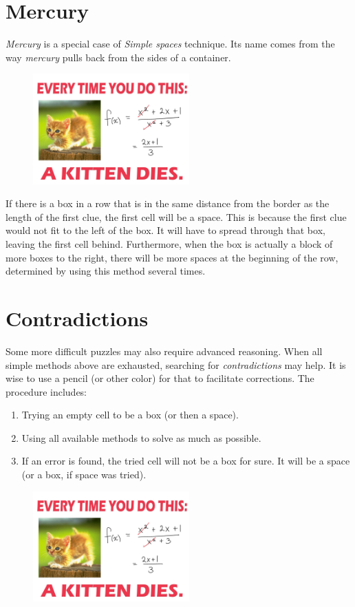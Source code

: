 \section{Mercury}
\textit{Mercury} is a special case of \textit{Simple spaces} technique. Its name comes from the way \textit{mercury} pulls back from the sides of a container.
\begin{figure}
\centering
\includegraphics[width=6cm]{picture/obr.jpg}
\end{figure}
If there is a box in a row that is in the same distance from the border as the length of the first clue, the first cell will be a space. This is because the first clue would not fit to the left of the box. It will have to spread through that box, leaving the first cell behind. Furthermore, when the box is actually a block of more boxes to the right, there will be more spaces at the beginning of the row, determined by using this method several times.


\section{Contradictions}
Some more difficult puzzles may also require advanced reasoning. When all simple methods above are exhausted, searching for \textit{contradictions} may help. It is wise to use a pencil (or other color) for that to facilitate corrections. The procedure includes:

\begin{enumerate} 
 \item {Trying an empty cell to be a box (or then a space).}

\item {Using all available methods to solve as much as possible.}

\item {If an error is found, the tried cell will not be a box for sure. It will be a space (or a box, if space was tried).} 
\end{enumerate}


\begin{figure}
\centering
\includegraphics[width=6cm]{picture/obr.jpg}
\end{figure}

